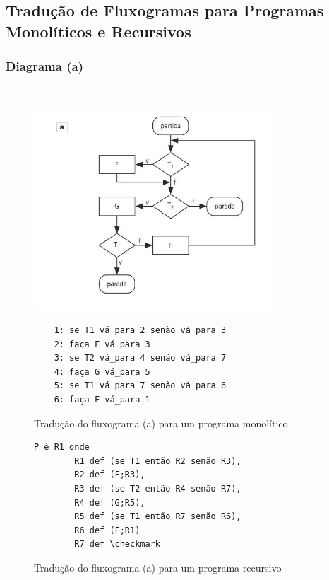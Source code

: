 \documentclass[12pt,fleqn]{article}
\begin{document}
\newpage
\subsection{Tradução de Fluxogramas para Programas Monolíticos e Recursivos}

\subsubsection{Diagrama (a)}
~
\begin{figure}[H]
    \centering
    \includegraphics[height=7.5cm]{img/diagrama_a}
\end{figure}
%
\begin{figure}[H]
\begin{verbatim}
    1: se T1 vá_para 2 senão vá_para 3
    2: faça F vá_para 3
    3: se T2 vá_para 4 senão vá_para 7
    4: faça G vá_para 5
    5: se T1 vá_para 7 senão vá_para 6
    6: faça F vá_para 1
\end{verbatim}
\caption{Tradução do fluxograma (a) para um programa monolítico}
\end{figure}
%
\begin{figure}[H]
\begin{Verbatim}[commandchars=\\\{\},codes={\catcode`\$=3\catcode`\^=7}]
    P é R1 onde
        R1 def (se T1 então R2 senão R3),
        R2 def (F;R3),
        R3 def (se T2 então R4 senão R7),
        R4 def (G;R5),
        R5 def (se T1 então R7 senão R6),
        R6 def (F;R1)
        R7 def \checkmark
\end{Verbatim}
\caption{Tradução do fluxograma (a) para um programa recursivo}
\end{figure}

\newpage
\end{document}
